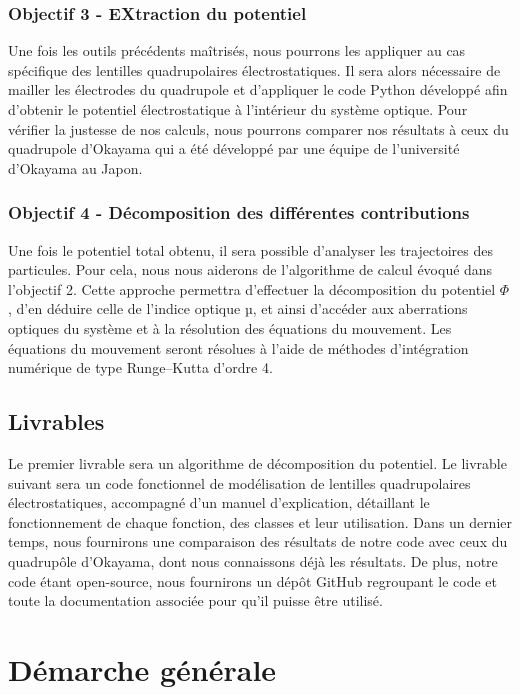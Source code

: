 \documentclass{report}
\begin{document}
\subsection{Objectif 3 - EXtraction du potentiel}
Une fois les outils précédents maîtrisés, nous pourrons les appliquer au cas spécifique des 
lentilles quadrupolaires électrostatiques. Il sera alors nécessaire de mailler les électrodes du 
quadrupole et d’appliquer le code Python développé afin d’obtenir le potentiel électrostatique 
à l’intérieur du système optique. 
Pour vérifier la justesse de nos calculs, nous pourrons comparer nos résultats à ceux du 
quadrupole d’Okayama qui a été développé par une équipe de l’université d’Okayama au 
Japon.  

\subsection{Objectif 4 - Décomposition des différentes contributions}
Une fois le potentiel total obtenu, il sera possible d’analyser les trajectoires des particules. 
Pour cela, nous nous aiderons de l'algorithme de calcul évoqué dans l’objectif 2. Cette 
approche permettra d’effectuer la décomposition du potentiel $\Phi$, d’en déduire celle de l’indice 
optique µ, et ainsi d’accéder aux aberrations optiques du système et à la résolution des 
équations du mouvement.  
Les équations du mouvement seront résolues à l’aide de méthodes d’intégration numérique 
de type Runge–Kutta d’ordre 4. 

\section{Livrables}
Le premier livrable sera un algorithme de décomposition du potentiel. 
Le livrable suivant sera un code fonctionnel de modélisation de lentilles quadrupolaires 
électrostatiques, accompagné d’un manuel d’explication, détaillant le fonctionnement de 
chaque fonction, des classes et leur utilisation. 
Dans un dernier temps, nous fournirons une comparaison des résultats de notre code avec 
ceux du quadrupôle d’Okayama, dont nous connaissons déjà les résultats. 
De plus, notre code étant open-source, nous fournirons un dépôt GitHub regroupant le code 
et toute la documentation associée pour qu’il puisse être utilisé. 


\chapter{Démarche générale}
\end{document}
